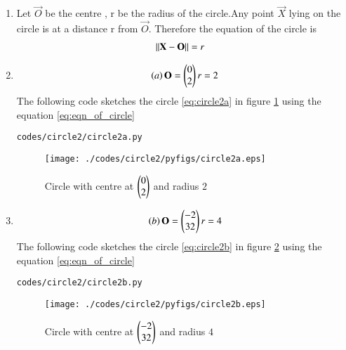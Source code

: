 \renewcommand{\theequation}{\theenumi}
\begin{enumerate}[label=\thesection.\arabic*.,ref=\thesection.\theenumi]

\item Let $\vec{O}$ be the centre , r be the radius of the circle.Any point $\vec{X}$ lying on the circle is at a distance r from $\vec{O}$.
\newline
Therefore the equation of the circle is 
\begin{align}
\left\lVert\mathbf{X}-\mathbf{O}\right\rVert &=r
\label{eq:eqn_of_circle}
\end{align}

\item
\begin{align}
\left(a\right)\mathbf{O}=\begin{pmatrix}0\\2\end{pmatrix}
r=2
\label{eq:circle2a}
\end{align}
The following code sketches the circle \ref{eq:circle2a} in figure \ref{fig:circle2a} using the equation \ref{eq:eqn_of_circle}
\begin{lstlisting}
codes/circle2/circle2a.py
\end{lstlisting}
\begin{figure}[!ht]
\centering
\texttt{[image: ./codes/circle2/pyfigs/circle2a.eps]}
\caption{Circle with centre at $\begin{pmatrix}0\\2\end{pmatrix}$ and radius $2$}
\label{fig:circle2a}
\end{figure}

\item
\begin{align}
\left(b\right)\mathbf{O}=\begin{pmatrix}-2\\32\end{pmatrix}
r=4
\label{eq:circle2b}
\end{align}
The following code sketches the circle \ref{eq:circle2b} in figure \ref{fig:circle2b} using the equation \ref{eq:eqn_of_circle}
\begin{lstlisting}
codes/circle2/circle2b.py
\end{lstlisting}
\begin{figure}[!ht]
\centering
\texttt{[image: ./codes/circle2/pyfigs/circle2b.eps]}
\caption{Circle with centre at $\begin{pmatrix}-2\\32\end{pmatrix}$ and radius $4$}
\label{fig:circle2b}
\end{figure}



\end{enumerate}

